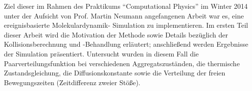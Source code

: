 Ziel dieser im Rahmen des Praktikums ``Computational Physics'' im Winter 2014 unter der Aufsicht von Prof. Martin Neumann angefangenen Arbeit war es, eine ereignisbasierte Molekulardynamik- Simulation zu implementieren. Im ersten Teil dieser Arbeit wird die Motivation der Methode sowie Details bezüglich der Kollisionsberechnung und -Behandlung erläutert; anschließend werden Ergebnisse der Simulation präsentiert. Untersucht wurden in diesem Fall die Paarverteilungsfunktion bei verschiedenen Aggregatszuständen, die thermische Zustandsgleichung, die Diffusionskonstante sowie die Verteilung der freien Bewegungszeiten (Zeitdifferenz zweier Stöße).